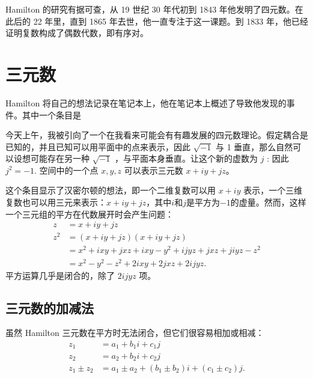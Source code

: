 Hamilton 的研究有据可查，从 19 世纪 30 年代初到 1843 年他发明了四元数。在此后的 22 年里，直到 1865 年去世，他一直专注于这一课题。到 1833 年，他已经证明复数构成了偶数代数，即有序对\cite{bib5-6}。

\section{三元数}
Hamilton 将自己的想法记录在笔记本上，他在笔记本上概述了导致他发现的事件。其中一个条目是

\begin{CJK}{UTF8}{gkai}
    今天上午，我被引向了一个在我看来可能会有有趣发展的四元数理论。假定耦合是已知的，并且已知可以用平面中的点来表示，因此 $\sqrt{-1}$ 与 1 垂直，那么自然可以设想可能存在另一种 $\sqrt{-1}$ ，与平面本身垂直。让这个新的虚数为 $j$ : 因此 $j^{2}=-1$. 空间中的一个点 $x, y, z$ 可以表示三元数 $x+i y+j z$。\cite{bib5-7}
\end{CJK}

这个条目显示了汉密尔顿的想法，即一个二维复数可以用 $x+i y$ 表示，一个三维复数也可以用三元来表示：$x+i y+j z$，其中$i$和$j$是平方为$-1$的虚量。然而，这样一个三元组的平方在代数展开时会产生问题：
$$
    \begin{aligned}
        z     & =x+i y+j z                                                 \\
        z^{2} & =(x+i y+j z)(x+i y+j z)                                    \\
              & =x^{2}+i x y+j x z+i x y-y^{2}+i j y z+j x z+j i y z-z^{2} \\
              & =x^{2}-y^{2}-z^{2}+2 i x y+2 j x z+2 i j y z .
    \end{aligned}
$$
平方运算几乎是闭合的，除了 $2 i j y z$ 项。

\subsection{三元数的加减法}
虽然 Hamilton 三元数在平方时无法闭合，但它们很容易相加或相减：
$$
    \begin{aligned}
        z_{1}           & =a_{1}+b_{1} i+c_{1} j                                                           \\
        z_{2}           & =a_{2}+b_{2} i+c_{2} j                                                           \\
        z_{1} \pm z_{2} & =a_{1} \pm a_{2}+\left(b_{1} \pm b_{2}\right) i+\left(c_{1} \pm c_{2}\right) j .
    \end{aligned}
$$

